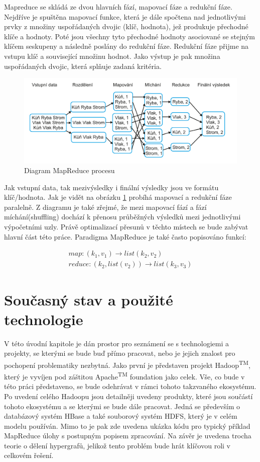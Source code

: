 \documentclass[thesis=M,czech]{FITthesis}[2012/06/26]
\begin{document}
Mapreduce se skládá ze dvou hlavních fází, mapovací fáze a redukční fáze. Nejdříve je spuštěna mapovací funkce, která je dále spočtena nad jednotlivými prvky z množiny uspořádaných dvojic (klíč, hodnota), jež produkuje přechodné klíče a hodnoty.\cite{HadoopDG}
Poté jsou všechny tyto přechodné hodnoty asociované se stejným klíčem seskupeny a následně poslány do redukční fáze. Redukční fáze přijme na vstupu klíč a související množinu hodnot. Jako výstup je pak množina uspořádaných dvojic, která splňuje zadaná kritéria.
\begin{figure}[h]\centering
	\includegraphics[width=1\textwidth, angle=0]			{files/MapReduce}
	\caption[Diagram MapReduce procesu]{Diagram MapReduce procesu}\label{fig:mapred}
\end{figure} 

Jak vstupní data, tak mezivýsledky i finální výsledky jsou ve formátu klíč/hodnota. Jak je vidět na obrázku \ref{fig:mapred} probíhá mapovací a redukční fáze paralelně. Z diagramu je také zřejmé, že mezi mapovací fází a fází míchání(shuffling) dochází k přenosu průběžných výsledků mezi jednotlivými výpočetními uzly. Právě optimalizací přesunů v těchto místech se bude zabývat hlavní část této práce. 
Paradigma MapReduce je také často popisováno funkcí: 

\begin{eqnarray}
	map: (k_1, v_1) \rightarrow  list(k_2, v_2) \nonumber \\
	reduce: (k_2, list(v_2)) \rightarrow list(k_3, v_3) \nonumber 
\end{eqnarray}



\chapter{Současný stav a použité technologie}
V této úvodní kapitole je dán prostor pro seznámení se s technologiemi a projekty, se kterými se bude buď přímo pracovat, nebo je jejich znalost pro pochopení problematiky nezbytná. Jako první je představen projekt Hadoop\textsuperscript{TM}, který je vyvíjen pod záštitou Apache\textsuperscript{TM} foundation jako celek. Vše, co bude v této práci představeno, se bude odehrávat v rámci tohoto takzvaného ekosystému. Po uvedení celého Hadoopu jsou detailněji uvedeny produkty, které jsou součástí tohoto ekosystému a se kterými se bude dále pracovat. Jedná se především o databázový systém HBase a také souborový systém HDFS, který je v celém modelu používán. Mimo to je pak zde uvedena ukázka kódu pro typický příklad MapReduce úlohy s postupným popisem zpracování. Na závěr je uvedena trocha teorie o dělení hypergrafů, jelikož tento problém bude hrát klíčovou roli v celkovém řešení.
\end{document}
